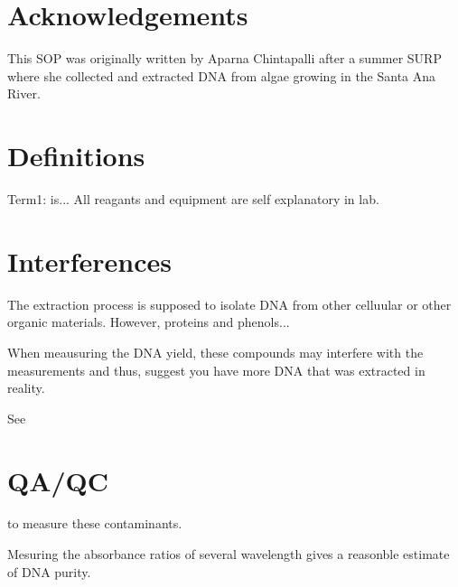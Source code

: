 \documentclass[12pt]{../SOP3_alpha}
\begin{document}
\tableofcontents

\newpage

\section{Acknowledgements}

This SOP was originally written by Aparna Chintapalli after a summer SURP where she collected and extracted DNA from algae growing in the Santa Ana River.

\section{Definitions}

\NP Term1: is... All reagants and equipment are self explanatory in lab. 

\section{Interferences}

\NP The extraction process is supposed to isolate DNA from other celluular or other organic materials. However, proteins and phenols...  

\NP When meausuring the DNA yield, these compounds may interfere with the measurements and thus, suggest you have more DNA that was extracted in reality. 

See \section{QA/QC} to measure these contaminants.

\NP Mesuring the absorbance ratios of several wavelength gives a reasonble estimate of DNA purity. 
\end{document}
